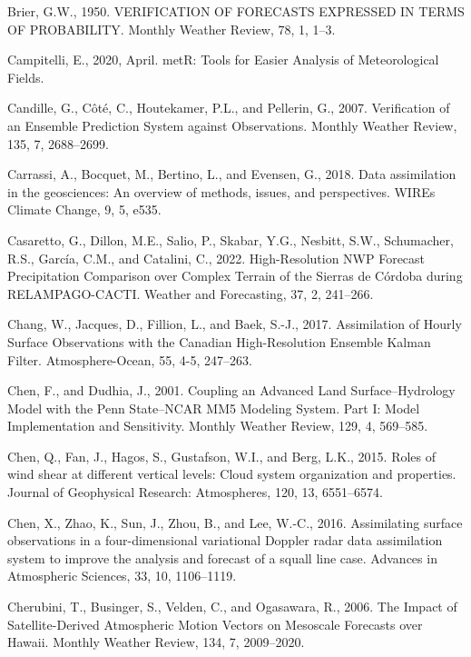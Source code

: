 \documentclass[12pt,oneside,a4paper]{reedthesis}
\begin{document}
\leavevmode\hypertarget{ref-brier1950}{}%
Brier, G.W., 1950. VERIFICATION OF FORECASTS EXPRESSED IN TERMS OF PROBABILITY. Monthly Weather Review, 78, 1, 1--3.

\leavevmode\hypertarget{ref-campitelli2020}{}%
Campitelli, E., 2020, April. metR: Tools for Easier Analysis of Meteorological Fields.

\leavevmode\hypertarget{ref-candille2007}{}%
Candille, G., Côté, C., Houtekamer, P.L., and Pellerin, G., 2007. Verification of an Ensemble Prediction System against Observations. Monthly Weather Review, 135, 7, 2688--2699.

\leavevmode\hypertarget{ref-carrassi2018}{}%
Carrassi, A., Bocquet, M., Bertino, L., and Evensen, G., 2018. Data assimilation in the geosciences: An overview of methods, issues, and perspectives. WIREs Climate Change, 9, 5, e535.

\leavevmode\hypertarget{ref-casaretto2022}{}%
Casaretto, G., Dillon, M.E., Salio, P., Skabar, Y.G., Nesbitt, S.W., Schumacher, R.S., García, C.M., and Catalini, C., 2022. High-Resolution NWP Forecast Precipitation Comparison over Complex Terrain of the Sierras de Córdoba during RELAMPAGO-CACTI. Weather and Forecasting, 37, 2, 241--266.

\leavevmode\hypertarget{ref-chang2017}{}%
Chang, W., Jacques, D., Fillion, L., and Baek, S.-J., 2017. Assimilation of Hourly Surface Observations with the Canadian High-Resolution Ensemble Kalman Filter. Atmosphere-Ocean, 55, 4-5, 247--263.

\leavevmode\hypertarget{ref-chen2001}{}%
Chen, F., and Dudhia, J., 2001. Coupling an Advanced Land Surface--Hydrology Model with the Penn State--NCAR MM5 Modeling System. Part I: Model Implementation and Sensitivity. Monthly Weather Review, 129, 4, 569--585.

\leavevmode\hypertarget{ref-chen2015}{}%
Chen, Q., Fan, J., Hagos, S., Gustafson, W.I., and Berg, L.K., 2015. Roles of wind shear at different vertical levels: Cloud system organization and properties. Journal of Geophysical Research: Atmospheres, 120, 13, 6551--6574.

\leavevmode\hypertarget{ref-chen2016}{}%
Chen, X., Zhao, K., Sun, J., Zhou, B., and Lee, W.-C., 2016. Assimilating surface observations in a four-dimensional variational Doppler radar data assimilation system to improve the analysis and forecast of a squall line case. Advances in Atmospheric Sciences, 33, 10, 1106--1119.

\leavevmode\hypertarget{ref-cherubini2006}{}%
Cherubini, T., Businger, S., Velden, C., and Ogasawara, R., 2006. The Impact of Satellite-Derived Atmospheric Motion Vectors on Mesoscale Forecasts over Hawaii. Monthly Weather Review, 134, 7, 2009--2020.
\end{document}
